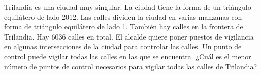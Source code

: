 Trilandia es una ciudad muy singular. La ciudad tiene la forma de un triángulo equilátero de lado 2012. Las calles dividen la ciudad en varias manzanas con forma de triángulo equilátero de lado 1. También hay calles en la frontera de Trilandia. Hay 6036 calles en total. El alcalde quiere poner puestos de vigilancia en algunas intersecciones de la ciudad para controlar las calles. Un punto de control puede vigilar todas las calles en las que se encuentra. ¿Cuál es el menor número de puntos de control necesarios para vigilar todas las calles de Trilandia?
